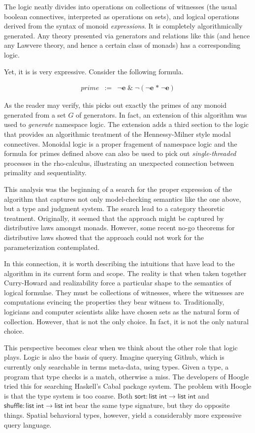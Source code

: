 The logic neatly divides into operations on collections of witnesses
(the usual boolean connectives, interpreted as operations on sets),
and logical operations derived from the syntax of monoid
\emph{expressions}. It is completely algorithmically generated. Any
theory presented via generators and relations like this (and hence any
Lawvere theory, and hence a certain class of monads) has a
corresponding logic.

Yet, it is is very expressive. Consider the following formula.

\begin{eqnarray*}
  prime & := & \neg \mathbf{e} \; \& \; \neg (\neg \mathbf{e} \; \mathbf{*}\; \neg \mathbf{e})
\end{eqnarray*}

As the reader may verify, this picks out exactly the primes of any
monoid generated from a set $G$ of generators. In fact, an extension
of this algorithm was used to \emph{generate} namespace logic. The
extension adds a third section to the logic that provides an
algorithmic treatment of the Hennessy-Milner style modal
connectives. Monoidal logic is a proper fragement of namespace logic
and the formula for primes defined above can also be used to pick out
\emph{single-threaded} processes in the rho-calculus, illustrating an
unexpected connection between primality and sequentiality.

This analysis was the beginning of a search for the proper expression
of the algorithm that captures not only model-checking semantics like
the one above, but a type and judgment system. The search lead to a
category theoretic treatment. Originally, it seemed that the approach
might be captured by distributive laws amongst monads. However, some
recent no-go theorems for distributive laws showed that the approach
could not work for the parameterization contemplated.

In this connection, it is worth describing the intuitions that have
lead to the algorithm in its current form and scope. The reality is
that when taken together Curry-Howard and realizability force a
particular shape to the semantics of logical formulae. They must be
collections of witnesses, where the witnesses are computations
evincing the properties they bear witness to. Traditionally, logicians
and computer scientists alike have chosen sets as the natural form of
collection. However, that is not the only choice. In fact, it is not
the only natural choice.

This perspective becomes clear when we think about the other role that
logic plays. Logic is also the basis of query. Imagine querying
Github, which is currently only searchable in terms meta-data, using
types. Given a type, a program that type checks is a match, otherwise
a miss. The developers of Hoogle tried this for searching Haskell's
Cabal package system. The problem with Hoogle is that the type system
is too coarse. Both $\mathsf{sort} : \mathsf{list}\; \mathsf{int} \to \mathsf{list} \; \mathsf{int}$ and $\mathsf{shuffle} : \mathsf{list}\; \mathsf{int} \to \mathsf{list} \; \mathsf{int}$ bear the same type signature, but they do opposite
things. Spatial behavioral types, however, yield a considerably more
expressive query language.

